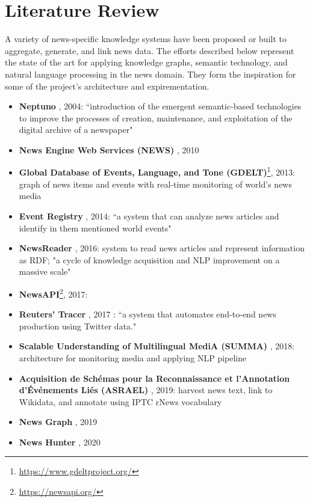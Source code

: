 \documentclass[11pt]{article}   	%
\begin{document}
\newpage
\section{Literature Review}

A variety of news-specific knowledge systems have been proposed or built to aggregate, generate, and link news data. The efforts described below represent the state of the art for applying knowledge graphs, semantic technology, and natural language processing in the news domain. They form the inspiration for some of the project's architecture and expirementation.

\begin{itemize}
\item \textbf{Neptuno} \cite{castells2004neptuno}, 2004: ``introduction of the emergent semantic-based technologies to improve the processes of creation, maintenance, and exploitation of the digital archive of a newspaper"
\item \textbf{News Engine Web Services (NEWS)} \cite{fernandez2010news}, 2010
\item \textbf{Global Database of Events, Language, and Tone (GDELT)}\footnote{\url{https://www.gdeltproject.org/}}, 2013: graph of news items and events with real-time monitoring of world's news media
\item \textbf{Event Registry} \cite{leban2014event}, 2014: ``a system that can analyze news articles and identify in them mentioned world events"
\item \textbf{NewsReader} \cite{vossen2016newsreader}, 2016: system to read news articles and represent information as RDF; "a cycle of knowledge acquisition and NLP improvement on a massive scale"
\item \textbf{NewsAPI}\footnote{\url{https://newsapi.org/}}, 2017: 
\item \textbf{Reuters' Tracer} \cite{liu2017reuters}, 2017 : ``a system that automates end-to-end news production using Twitter data."
\item \textbf{Scalable Understanding of Multilingual MediA (SUMMA)} \cite{germann2018integrating}, 2018: architecture for monitoring media and applying NLP pipeline
\item \textbf{Acquisition de Schémas pour la Reconnaissance et l'Annotation d'Événements Liés (ASRAEL)} \cite{rudnik2019searching}, 2019: harvest news text, link to Wikidata, and annotate using IPTC rNews vocabulary
\item \textbf{News Graph} \cite{liu2019news}, 2019
\item \textbf{News Hunter} \cite{berven2020knowledge}, 2020
\end{itemize}
\end{document}
